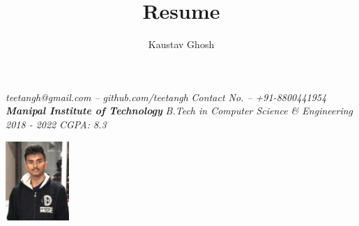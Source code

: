 \documentclass{article}
\makeatletter
\renewcommand{\maketitle}{
    \begin{flushleft}        
        {\huge\rmfamily
        \theauthor}\newline
        \vspace{0.1em}
        \textit{teetangh@gmail.com -- github.com/teetangh}\newline
        \textit{Contact No. -- +91-8800441954}\newline
        \textbf{\emph{Manipal Institute of Technology}}\newline
        \textit{B.Tech in Computer Science \& Engineering}
        \textit{2018 - 2022}\newline
        \textit{CGPA: 8.3}\newline
    \end{flushleft}

}
\makeatother
\begin{document}
    


\begin{multicols}{2}
    \title{Resume}
        \author{Kaustav Ghosh}
    \maketitle
    \begin{flushright}
        \includegraphics[height=3cm]{kaustav2.jpeg}
    \end{flushright}
\end{multicols}
\end{document}
